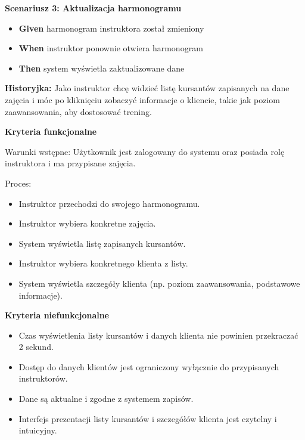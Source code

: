 \documentclass[a4paper,12pt]{article}
\begin{document}
\textbf{Scenariusz 3: Aktualizacja harmonogramu}
\begin{itemize}
    \item \textbf{Given} harmonogram instruktora został zmieniony
    \item \textbf{When} instruktor ponownie otwiera harmonogram
    \item \textbf{Then} system wyświetla zaktualizowane dane
\end{itemize}

\vspace{0,5cm}

\noindent \textbf{Historyjka:} Jako instruktor chcę widzieć listę kursantów zapisanych na dane zajęcia i móc po kliknięciu zobaczyć informacje o kliencie, takie jak poziom zaawansowania, aby dostosować trening.

\vspace{0,2cm}

\noindent \textbf{Kryteria funkcjonalne}

\vspace{0,2cm}

\noindent Warunki wstępne: Użytkownik jest zalogowany do systemu oraz posiada rolę instruktora i ma przypisane zajęcia.

\vspace{0,2cm}

\noindent Proces:

\begin{itemize}
    \item Instruktor przechodzi do swojego harmonogramu.
    \item Instruktor wybiera konkretne zajęcia.
    \item System wyświetla listę zapisanych kursantów.
    \item Instruktor wybiera konkretnego klienta z listy.
    \item System wyświetla szczegóły klienta (np. poziom zaawansowania, podstawowe informacje).
\end{itemize}

\noindent \textbf{Kryteria niefunkcjonalne}
\begin{itemize}
    \item Czas wyświetlenia listy kursantów i danych klienta nie powinien przekraczać 2 sekund.
    \item Dostęp do danych klientów jest ograniczony wyłącznie do przypisanych instruktorów.
    \item Dane są aktualne i zgodne z systemem zapisów.
    \item Interfejs prezentacji listy kursantów i szczegółów klienta jest czytelny i intuicyjny.
\end{itemize}
\end{document}
